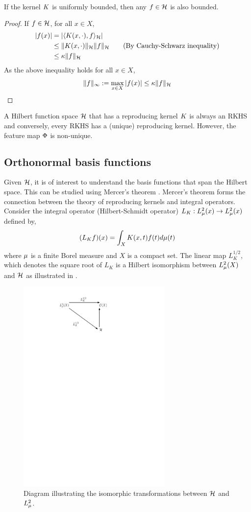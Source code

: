 \begin{proposition}
\label{prop:RKHS_bounded}
	If the kernel $K$ is uniformly bounded, then any $f \in {\cal H}$ is also bounded. 
\end{proposition}
\begin{proof}
	If $f \in {\cal H}$, for all $x \in X$,
	\[
	\begin{aligned}
	|f(x)| &= |\langle K(x,\cdot), f \rangle_{\cal H}| \\
	& \leq \|K(x,\cdot)\|_{\cal H} \|f\|_{\cal H} \qquad{\text{(By Cauchy-Schwarz inequality)}}\\ 
	& \leq \kappa \|f\|_{\cal H}
	\end{aligned}
	\]
	As the above inequality holds for all $x \in X$, 
	\[
	\|f\|_\infty := \max_{x\in X}|f(x)| \leq \kappa \|f\|_{\cal H}
	\]
\end{proof}
A Hilbert function space ${\cal H}$ that has a reproducing kernel $K$ is always an RKHS and conversely, every RKHS has a (unique) reproducing kernel. However, the feature map $\Phi$ is non-unique. 
\subsection{Orthonormal basis functions} 
Given ${\cal H}$, it is of interest to understand the basis functions that span the Hilbert space. This can be studied using Mercer's theorem \cite{merrus09}. Mercer's theorem forms the connection between the theory of reproducing kernels and integral operators. 
Consider the integral operator (Hilbert-Schmidt operator) $L_K:L^2_\mu(x) \to L^2_\mu(x)$ defined by,
\[
(L_K f)(x) = \int_X K(x,t) f(t) d\mu(t)
\]
where $\mu$ is a finite Borel measure and $X$ is a compact set.
The linear map $L_K^{1/2}$, which denotes the square root of $L_K$ is a Hilbert isomorphism between $L^2_{\mu}(X)$ and ${\cal H}$ as illustrated in . 

\begin{figure}[htbp]
	\centering
	\includegraphics[width=3in]{images/Chap3_RKHS_isomorphism}
	\caption{Diagram illustrating the isomorphic transformations between ${\cal H}$ and $L^2_\mu$.}
	\label{fig:rkhs_isomorphism}
\end{figure}

